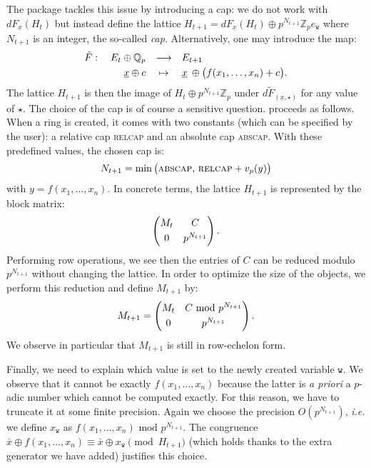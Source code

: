 \documentclass[sigconf]{acmart}
\newcommand{\Z}{\mathbb Z}
\newcommand{\Zp}{\Z_p}
\newcommand{\Q}{\mathbb Q}
\newcommand{\Qp}{\Q_p}
\newcommand{\ttw}{\texttt{w}\xspace}
\newcommand{\ZpLC}{\text{\color{output} \rm \tt ZpLC}\xspace}
\theoremstyle{definition}
\begin{document}
The package \ZpLC tackles this issue by introducing a cap: we do not 
work with $dF_{\underline x}(H_t)$ but instead define the lattice
$H_{t+1} = dF_{\underline x}(H_t) \oplus p^{N_{t+1}} \Zp e_\ttw$
where $N_{t+1}$ is an integer, the so-called \emph{cap}.
Alternatively, one may introduce the map:
\begin{equation}
\label{eq:tildeF}
\begin{array}{rcl}
\tilde F: \quad E_t \oplus \Qp & \longrightarrow & E_{t+1} \smallskip \\
\underline x \oplus c & \mapsto & \underline x \:\oplus 
\big(f(x_1, \ldots, x_n) + c\big).
\end{array}
\end{equation}
The lattice $H_{t+1}$ is then the image of $H_t \oplus p^{N_{t+1}}
\Zp$ under $d\tilde F_{(\underline x, \star)}$ for any value of $\star$.
The choice of the 
cap is of course a sensitive question. \ZpLC proceeds as follows. When a 
ring is created, it comes with two constants (which can be specified by 
the user): a relative cap \textsc{relcap} and an absolute cap 
\textsc{abscap}. With these predefined values, the chosen cap is:
\begin{equation}
\label{eq:cap}
N_{t+1} = 
\min\big(\textsc{abscap},\, \textsc{relcap} + v_p(y)\big)
\end{equation}
with $y = f(x_1, \ldots, x_n)$.
In concrete terms, the lattice $H_{t+1}$ is represented by the block 
matrix:
$$\left(\begin{matrix}
M_t & C \smallskip \\ 0 & p^{N_{t+1}}
\end{matrix}\right).$$
Performing row operations, we see then the entries of $C$ can be
reduced modulo $p^{N_{t+1}}$ without changing the lattice. In order
to optimize the size of the objects, we perform this reduction and
define $M_{t+1}$ by:
$$M_{t+1} = \left(\begin{matrix}
M_t & C \text{ mod } p^{N_{t+1}} \smallskip \\ 0 & p^{N_{t+1}}
\end{matrix}\right).$$
We observe in particular that $M_{t+1}$ is still in row-echelon form.

Finally, we need to explain which value is set to the newly created 
variable $\ttw$. We observe that it cannot be exactly $f(x_1, \ldots, 
x_n)$ because the latter is \emph{a priori} a $p$-adic number which 
cannot be computed exactly. For this reason, we have to truncate it at 
some finite precision. Again we choose the precision $O(p^{N_{t+1}})$,
\emph{i.e.} we define $x_\ttw$ as $f(x_1, \ldots, x_n) \text{ mod } 
p^{N_{t+1}}$. 
The congruence
$\bar x \oplus f(x_1, \ldots, x_n) \equiv
\bar x \oplus x_\ttw \pmod{H_{t+1}}$
(which holds thanks to the extra generator we have added) justifies
this choice.
\end{document}
